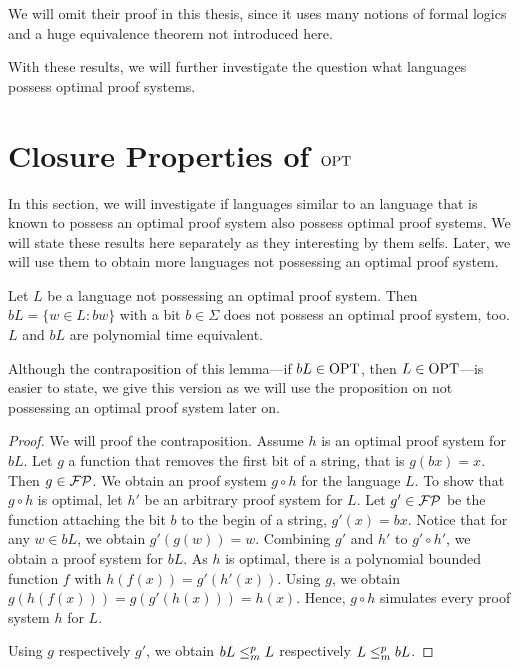   We will omit their proof in this thesis, since it uses many notions of formal logics and a huge equivalence theorem not introduced here.

  With these results, we will further investigate the question what languages possess optimal proof systems.

  \section{Closure Properties of $\text{OPT}$} 

  In this section, we will investigate if languages similar to an language that is known to possess an optimal proof system also possess optimal proof systems. We will state these results here separately as they interesting by them selfs. Later, we will use them to obtain more languages not possessing an optimal proof system.

  \begin{lemma} \label{lemAddBit}
    Let \(L\) be a language not possessing an optimal proof system. Then \(bL = \{ w \in L : bw \}\) with a bit \(b \in \Sigma\) does not possess an optimal proof system, too. \(L\) and \(bL\) are polynomial time equivalent.
  \end{lemma}

  Although the contraposition of this lemma---if \(bL \in \text{OPT}\), then \(L \in \text{OPT}\)---is easier to state, we give this version as we will use the proposition on not possessing an optimal proof system later on.
  
  \begin{proof} 
    We will proof the contraposition. Assume \(h\) is an optimal proof system for \(bL\). Let \(g\) a function that removes the first bit of a string, that is \(g(bx) = x\). Then \(g \in \mathcal{FP}\). We obtain an proof system \(g \circ h\) for the language \(L\). To show that \(g \circ h\) is optimal, let \(h'\) be an arbitrary proof system for \(L\). Let \(g' \in \mathcal{FP}\) be the function attaching the bit \(b\) to the begin of a string, \(g'(x) = bx\). Notice that for any \(w \in bL\), we obtain \(g'(g(w)) = w\). Combining \(g'\) and \(h'\) to \(g' \circ h'\), we obtain a proof system for \(bL\). As \(h\) is optimal, there is a polynomial bounded function \(f\) with \(h(f(x)) = g'(h'(x))\). Using \(g\), we obtain \(g(h(f(x))) = g(g'(h(x))) = h(x)\). Hence, \(g \circ h\) simulates every proof system \(h\) for \(L\).

    Using \(g\) respectively \(g'\), we obtain \(bL \leq_{m}^{p} L\) respectively \(L \leq_{m}^{p} bL\).
  \end{proof}

